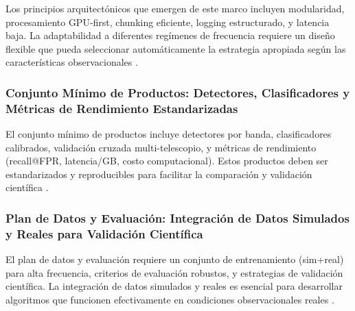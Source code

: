 Los principios arquitectónicos que emergen de este marco incluyen modularidad, procesamiento GPU-first, chunking eficiente, logging estructurado, y latencia baja. La adaptabilidad a diferentes regímenes de frecuencia requiere un diseño flexible que pueda seleccionar automáticamente la estrategia apropiada según las características observacionales \citep{zhang2024drafts}.

\subsubsection{Conjunto Mínimo de Productos: Detectores, Clasificadores y Métricas de Rendimiento Estandarizadas}

El conjunto mínimo de productos incluye detectores por banda, clasificadores calibrados, validación cruzada multi-telescopio, y métricas de rendimiento (recall@FPR, latencia/GB, costo computacional). Estos productos deben ser estandarizados y reproducibles para facilitar la comparación y validación científica \citep{zhang2024drafts}.

\subsubsection{Plan de Datos y Evaluación: Integración de Datos Simulados y Reales para Validación Científica}

El plan de datos y evaluación requiere un conjunto de entrenamiento (sim+real) para alta frecuencia, criterios de evaluación robustos, y estrategias de validación científica. La integración de datos simulados y reales es esencial para desarrollar algoritmos que funcionen efectivamente en condiciones observacionales reales \citep{zhang2024drafts}.

